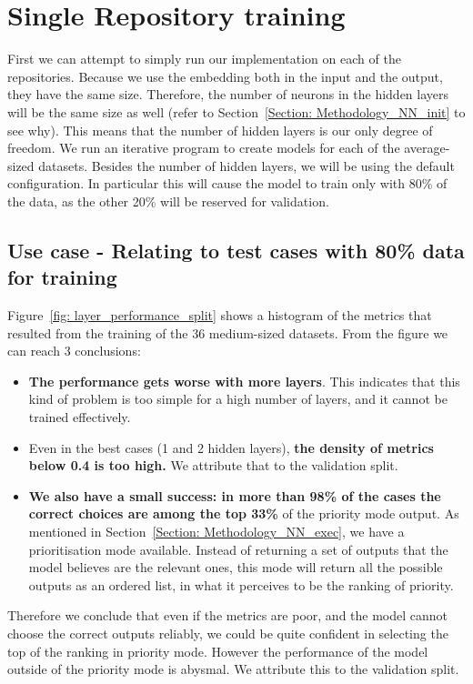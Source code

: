 \documentclass[a4paper, 11pt]{report}
\begin{document}
    \section{Single Repository training}
    First we can attempt to simply run our implementation on each of the repositories. Because we use the embedding both in the input and the output, they have the same size. Therefore, the number of neurons in the hidden layers will be the same size as well (refer to Section~\ref{Section: Methodology_NN_init} to see why). This means that the number of hidden layers is our only degree of freedom. We run an iterative program to create models for each of the average-sized datasets. Besides the number of hidden layers, we will be using the default configuration. In particular this will cause the model to train only with 80\% of the data, as the other 20\% will be reserved for validation.

    \subsection{Use case - Relating to test cases with 80\% data for training}
    Figure~\ref{fig: layer_performance_split} shows a histogram of the metrics that resulted from the training of the 36 medium-sized datasets. From the figure we can reach 3 conclusions:
    \begin{itemize}
        \item \textbf{The performance gets worse with more layers}. This indicates that this kind of problem is too simple for a high number of layers, and it cannot be trained effectively.
        \item Even in the best cases (1 and 2 hidden layers), \textbf{the density of metrics below 0.4 is too high.} We attribute that to the validation split.
        \item \textbf{We also have a small success: in more than 98\% of the cases the correct choices are among the top 33\%} of the priority mode output. As mentioned in Section~\ref{Section: Methodology_NN_exec}, we have a prioritisation mode available. Instead of returning a set of outputs that the model believes are the relevant ones, this mode will return all the possible outputs as an ordered list, in what it perceives to be the ranking of priority.
    \end{itemize}
    Therefore we conclude that even if the metrics are poor, and the model cannot choose the correct outputs reliably, we could be quite confident in selecting the top of the ranking in priority mode. However the performance of the model outside of the priority mode is abysmal. We attribute this to the validation split.
\end{document}
